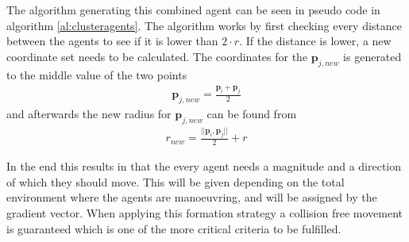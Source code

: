 \documentclass[a4paper,conference]{IEEEtran}
\begin{document}
The algorithm generating this combined agent can be seen in pseudo
code in algorithm \ref{al:clusteragents}.
The algorithm works by first checking every distance between the agents to see if it is lower
than $2 \cdot r$. If the distance is lower, a new coordinate set needs
to be calculated. The coordinates for the $\mathbf{p}_{j,new}$ is
generated to the middle value of the two points
\begin{align}
\mathbf{p}_{j,new} = \frac{\mathbf{p}_i + \mathbf{p}_j}{2}
\end{align}
and afterwards the new radius for $\mathbf{p}_{j,new}$ can be found from
\begin{align}
r_{new} = \frac{||\mathbf{p}_i , \mathbf{p}_j||}{2} + r
\end{align}

In the end this results in that the every agent needs a magnitude and
a direction of which they should move. This will be given depending on
the total environment where the agents are manoeuvring, and will be
assigned by the gradient vector. When applying this formation strategy
a collision free movement is guaranteed which is one of the more
critical criteria to be fulfilled. 
\end{document}
